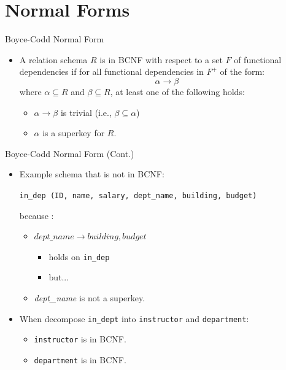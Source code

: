 \documentclass[aspectratio=169]{beamer}
\begin{document}
\section{Normal Forms}

\begin{frame}{Boyce-Codd Normal Form}
    \begin{itemize}
        \item A relation schema $R$ is in BCNF with respect to a set $F$ of functional dependencies if for all functional dependencies in $F^+$ of the form:
        $$
            \alpha \rightarrow \beta
        $$
        where $\alpha \subseteq R$ and $\beta \subseteq R$, at least one of the following holds:
        \begin{itemize}
            \item $\alpha \rightarrow \beta$ is trivial (i.e., $\beta \subseteq \alpha$)
            \item $\alpha$ is a superkey for $R$.
        \end{itemize}
    \end{itemize}
\end{frame}

\begin{frame}{Boyce-Codd Normal Form (Cont.)}
    \begin{itemize}
        \item Example schema that is not in BCNF: \\
            \begin{center}
                \texttt{\footnotesize in\_dep (ID, name, salary, dept\_name, building, budget)}
            \end{center}
        because :
        \begin{itemize}
            \item $dept\_name \rightarrow building, budget$
            \begin{itemize}
                \item holds on \texttt{in\_dep}
                \item but...
            \end{itemize}
            \item \textit{dept\_name} is not a superkey.
        \end{itemize}
        \item When decompose \texttt{in\_dept} into \texttt{instructor} and \texttt{department}:
        \begin{itemize}
            \item \texttt{instructor} is in BCNF.
            \item \texttt{department} is in BCNF.
        \end{itemize}
    \end{itemize}
\end{frame}
\end{document}
